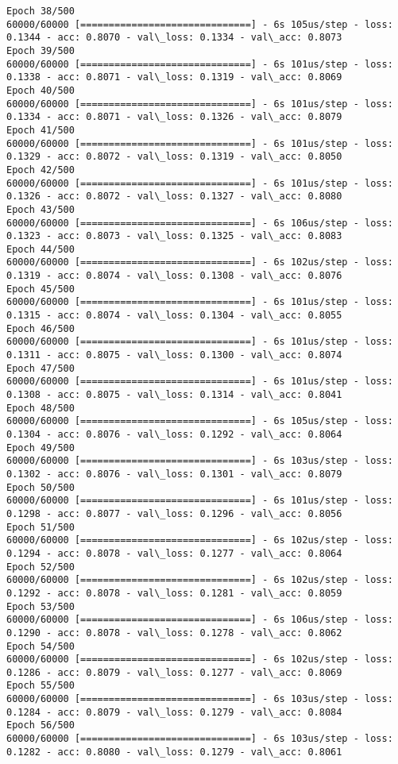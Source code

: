 \documentclass[11pt]{article}
\begin{document}
\begin{Verbatim}[commandchars=\\\{\}]
Epoch 38/500
60000/60000 [==============================] - 6s 105us/step - loss: 0.1344 - acc: 0.8070 - val\_loss: 0.1334 - val\_acc: 0.8073
Epoch 39/500
60000/60000 [==============================] - 6s 101us/step - loss: 0.1338 - acc: 0.8071 - val\_loss: 0.1319 - val\_acc: 0.8069
Epoch 40/500
60000/60000 [==============================] - 6s 101us/step - loss: 0.1334 - acc: 0.8071 - val\_loss: 0.1326 - val\_acc: 0.8079
Epoch 41/500
60000/60000 [==============================] - 6s 101us/step - loss: 0.1329 - acc: 0.8072 - val\_loss: 0.1319 - val\_acc: 0.8050
Epoch 42/500
60000/60000 [==============================] - 6s 101us/step - loss: 0.1326 - acc: 0.8072 - val\_loss: 0.1327 - val\_acc: 0.8080
Epoch 43/500
60000/60000 [==============================] - 6s 106us/step - loss: 0.1323 - acc: 0.8073 - val\_loss: 0.1325 - val\_acc: 0.8083
Epoch 44/500
60000/60000 [==============================] - 6s 102us/step - loss: 0.1319 - acc: 0.8074 - val\_loss: 0.1308 - val\_acc: 0.8076
Epoch 45/500
60000/60000 [==============================] - 6s 101us/step - loss: 0.1315 - acc: 0.8074 - val\_loss: 0.1304 - val\_acc: 0.8055
Epoch 46/500
60000/60000 [==============================] - 6s 101us/step - loss: 0.1311 - acc: 0.8075 - val\_loss: 0.1300 - val\_acc: 0.8074
Epoch 47/500
60000/60000 [==============================] - 6s 101us/step - loss: 0.1308 - acc: 0.8075 - val\_loss: 0.1314 - val\_acc: 0.8041
Epoch 48/500
60000/60000 [==============================] - 6s 105us/step - loss: 0.1304 - acc: 0.8076 - val\_loss: 0.1292 - val\_acc: 0.8064
Epoch 49/500
60000/60000 [==============================] - 6s 103us/step - loss: 0.1302 - acc: 0.8076 - val\_loss: 0.1301 - val\_acc: 0.8079
Epoch 50/500
60000/60000 [==============================] - 6s 101us/step - loss: 0.1298 - acc: 0.8077 - val\_loss: 0.1296 - val\_acc: 0.8056
Epoch 51/500
60000/60000 [==============================] - 6s 102us/step - loss: 0.1294 - acc: 0.8078 - val\_loss: 0.1277 - val\_acc: 0.8064
Epoch 52/500
60000/60000 [==============================] - 6s 102us/step - loss: 0.1292 - acc: 0.8078 - val\_loss: 0.1281 - val\_acc: 0.8059
Epoch 53/500
60000/60000 [==============================] - 6s 106us/step - loss: 0.1290 - acc: 0.8078 - val\_loss: 0.1278 - val\_acc: 0.8062
Epoch 54/500
60000/60000 [==============================] - 6s 102us/step - loss: 0.1286 - acc: 0.8079 - val\_loss: 0.1277 - val\_acc: 0.8069
Epoch 55/500
60000/60000 [==============================] - 6s 103us/step - loss: 0.1284 - acc: 0.8079 - val\_loss: 0.1279 - val\_acc: 0.8084
Epoch 56/500
60000/60000 [==============================] - 6s 103us/step - loss: 0.1282 - acc: 0.8080 - val\_loss: 0.1279 - val\_acc: 0.8061

\end{Verbatim}
\end{document}

